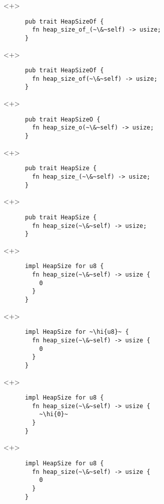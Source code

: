 \documentclass[usepdftitle=false]{beamer}
\renewcommand{\&}{\makebox[\widthof{\ampersand}][c]{\scalebox{0.9}[1.0]{\Book\ampersand}}}
\newcommand{\+}{\makebox[\widthof{+}][c]{\raisebox{-.2\height}{\scalefont{1.5}\Light+}}}
\newcommand{\hi}[1]{%
\tikz[baseline=(A.base)]
 \node[highlighting=0,inner sep=0pt,text depth=0pt] (A) {#1};%
}
\begin{document}
\begin{frame}[fragile]
\begin{onlyenv}
  \end{onlyenv}
  \begin{onlyenv}<+>
    \begin{verbatim}
      pub trait HeapSizeOf {
        fn heap_size_of_(~\&~self) -> usize;
      }
    \end{verbatim}
  \end{onlyenv}
  \begin{onlyenv}<+>
    \begin{verbatim}
      pub trait HeapSizeOf {
        fn heap_size_of(~\&~self) -> usize;
      }
    \end{verbatim}
  \end{onlyenv}
  \begin{onlyenv}<+>
    \begin{verbatim}
      pub trait HeapSizeO {
        fn heap_size_o(~\&~self) -> usize;
      }
    \end{verbatim}
  \end{onlyenv}
  \begin{onlyenv}<+>
    \begin{verbatim}
      pub trait HeapSize {
        fn heap_size_(~\&~self) -> usize;
      }
    \end{verbatim}
  \end{onlyenv}
  \begin{onlyenv}<+>
    \begin{verbatim}
      pub trait HeapSize {
        fn heap_size(~\&~self) -> usize;
      }
    \end{verbatim}
  \end{onlyenv}
\end{frame}

\begin{frame}[fragile]
  \begin{onlyenv}<+>
    \begin{verbatim}
      impl HeapSize for u8 {
        fn heap_size(~\&~self) -> usize {
          0
        }
      }
    \end{verbatim}
  \end{onlyenv}
  \begin{onlyenv}<+>
    \begin{verbatim}
      impl HeapSize for ~\hi{u8}~ {
        fn heap_size(~\&~self) -> usize {
          0
        }
      }
    \end{verbatim}
  \end{onlyenv}
  \begin{onlyenv}<+>
    \begin{verbatim}
      impl HeapSize for u8 {
        fn heap_size(~\&~self) -> usize {
          ~\hi{0}~
        }
      }
    \end{verbatim}
  \end{onlyenv}
  \begin{onlyenv}<+>
    \begin{verbatim}
      impl HeapSize for u8 {
        fn heap_size(~\&~self) -> usize {
          0
        }
      }
    \end{verbatim}
  \end{onlyenv}
\end{frame}
\end{document}
